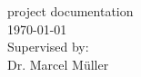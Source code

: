 \begin{titlepage}
\begin{center}
		\vspace{0.5cm}
		project documentation\\
		\vspace{2.2cm}
		\today\\
		\vspace{2.0cm}
		\large
		Supervised by:\\
		Dr. Marcel Müller\\
		\vspace{1cm}
		\end{center}
\end{titlepage}

\shipout\null
\shipout\null
